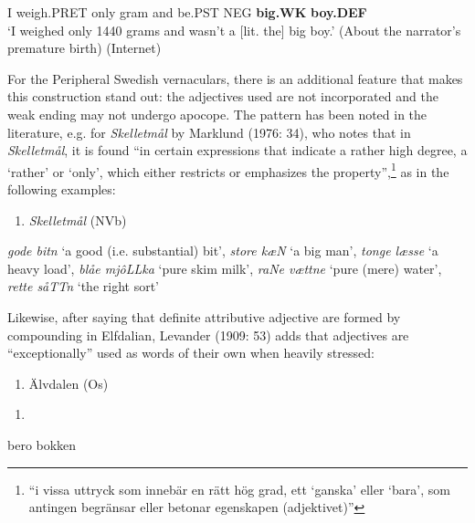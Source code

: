 I  weigh.PRET  only    gram  and  be.PST  NEG  \textbf{big.WK} \textbf{boy.DEF}\\ %


‘I weighed only 1440 grams and wasn’t a [lit. the] big boy.’ (About the narrator’s premature birth) (Internet) 
\z


For the Peripheral Swedish vernaculars, there is an additional feature that makes this construction stand out: the adjectives used are not incorporated and the weak ending may not undergo apocope. The pattern has been noted in the literature, e.g. for \textit{Skelletmål} by Marklund (1976: 34), who notes that in \textit{Skelletmål}, it is found “in certain expressions that indicate a rather high degree, a ‘rather’ or ‘only’, which either restricts or emphasizes the property”,\footnote{ “i vissa uttryck som innebär en rätt hög grad, ett ‘ganska’ eller ‘bara’, som antingen begränsar eller betonar egenskapen (adjektivet)”} as in the following examples:

\begin{enumerate} %
\item 
\textit{Skelletmål} (NVb)
\end{enumerate} %
\textit{gode bitn} ‘a good (i.e. substantial) bit’, \textit{store k}\textit{æ}\textit{N} ‘a big man’,\textit{ tonge læsse} ‘a heavy load’, \textit{blåe mjôLLka} ‘pure skim milk’, \textit{raNe vættne} ‘pure (mere) water’, \textit{rette såTTn }‘the right sort’

Likewise, after saying that definite attributive adjective are formed by compounding in Elfdalian, Levander (1909: 53) adds that adjectives are “exceptionally” used as words of their own when heavily stressed:

\begin{enumerate} %
\item 
\label{bkm:Ref155246246}Älvdalen (Os)

\end{enumerate} %
\setcounter{listLFOxcviiileveli}{0}
\begin{enumerate} %
\item 
\end{enumerate} %
\ea\label{}
\gll bero  bokken\\


